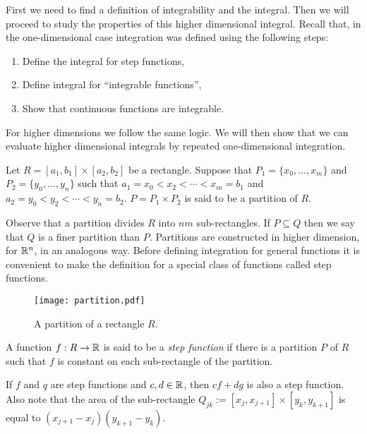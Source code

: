 First we need to find a definition of integrability and the integral.
Then we will proceed to study the properties of this higher dimensional integral.
Recall that, in the one-dimensional case integration was defined using the following steps:
\begin{enumerate}
    \item Define the integral for step functions,
    \item Define integral for ``integrable functions'',
    \item Show that continuous functions are integrable.
\end{enumerate}
For higher dimensions we follow the same logic.
We will then show that we can evaluate higher dimensional integrals by repeated one-dimensional integration.
%
\begin{definition*}[partition]
    Let \(R = [a_1,b_1] \times [a_2,b_2]\) be a rectangle.
    Suppose that \(P_1 = \{x_0,\ldots,x_m\}\) and \(P_2 = \{y_0,\ldots,y_n\}\) such that
    \(a_1 = x_0 < x_2 < \cdots < x_m = b_1\) and \(a_2 = y_0 < y_2 < \cdots < y_n = b_2\).
    \(P= P_1 \times P_2\) is said to be a partition of \(R\).
\end{definition*}
%
Observe that a partition divides \(R\) into \(nm\) sub-rectangles.
If \(P \subseteq Q\) then we say that \(Q\) is a finer partition than \(P\).
Partitions are constructed in higher dimension, for \(\mathbb{R}^n\), in an analogous way.
Before defining integration for general functions it is convenient to make the definition for a special class of functions called step functions.
%
\begin{figure}
    \centering
    \texttt{[image: partition.pdf]}
    \caption{A partition of a rectangle \(R\).}
\end{figure}
%
\begin{definition*}
    A function \(f:R\to \mathbb{R} \) is said to be a \emph{step function} if there is a partition \(P\) of \(R\) such that \(f\) is constant on each sub-rectangle of the partition.
\end{definition*}
%
If \(f\) and \(q\) are step functions and  \(c,d \in \mathbb{R}\), then \(c f + d g\) is also a step function.
Also note that the area of the sub-rectangle \(Q_{jk}:=[x_{j},x_{j+1}]\times [y_{k},y_{k+1}]\) is equal to \( (x_{j+1}-x_{j})(y_{k+1}-y_{k})\).

